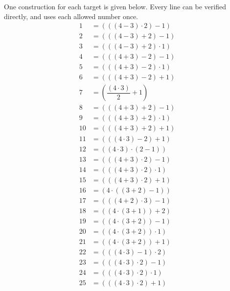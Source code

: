 One construction for each target is given below. Every line can be verified directly, and uses each allowed number once.\begin{align*}1&=(((4-3)\cdot 2)-1)\\2&=(((4-3)+2)-1)\\3&=(((4-3)+2)\cdot 1)\\4&=(((4+3)-2)-1)\\5&=(((4+3)-2)\cdot 1)\\6&=(((4+3)-2)+1)\\7&=(\dfrac{(4\cdot 3)}{2}+1)\\8&=(((4+3)+2)-1)\\9&=(((4+3)+2)\cdot 1)\\10&=(((4+3)+2)+1)\\11&=(((4\cdot 3)-2)+1)\\12&=((4\cdot 3)\cdot (2-1))\\13&=(((4+3)\cdot 2)-1)\\14&=(((4+3)\cdot 2)\cdot 1)\\15&=(((4+3)\cdot 2)+1)\\16&=(4\cdot ((3+2)-1))\\17&=(((4+2)\cdot 3)-1)\\18&=((4\cdot (3+1))+2)\\19&=((4\cdot (3+2))-1)\\20&=((4\cdot (3+2))\cdot 1)\\21&=((4\cdot (3+2))+1)\\22&=(((4\cdot 3)-1)\cdot 2)\\23&=(((4\cdot 3)\cdot 2)-1)\\24&=(((4\cdot 3)\cdot 2)\cdot 1)\\25&=(((4\cdot 3)\cdot 2)+1)\end{align*}
